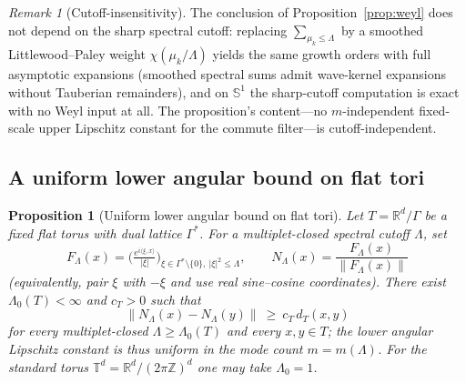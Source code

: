 \documentclass[11pt]{article}
\newtheorem{proposition}[theorem]{Proposition}
\theoremstyle{remark}
\newtheorem*{remark}{Remark}
\begin{document}
\begin{remark}[Cutoff-insensitivity]
The conclusion of Proposition~\ref{prop:weyl} does not depend on the sharp
spectral cutoff: replacing $\sum_{\mu_k\le\Lambda}$ by a smoothed
Littlewood--Paley weight $\chi(\mu_k/\Lambda)$ yields the same growth orders with
full asymptotic expansions (smoothed spectral sums admit wave-kernel expansions
without Tauberian remainders), and on $\mathbb S^1$ the sharp-cutoff computation
is exact with no Weyl input at all. The proposition's content---no $m$-independent
fixed-scale upper Lipschitz constant for the commute filter---is
cutoff-independent.
\end{remark}

\subsection*{A uniform lower angular bound on flat tori}
\begin{proposition}[Uniform lower angular bound on flat tori]
\label{prop:torus-lower-uniform}
Let $T=\mathbb R^d/\Gamma$ be a fixed flat torus with dual lattice $\Gamma^*$. For
a multiplet-closed spectral cutoff $\Lambda$, set
\[
F_\Lambda(x)=\Big(\tfrac{e^{i\langle\xi,x\rangle}}{\lvert\xi\rvert}\Big)_{\xi\in\Gamma^*\setminus\{0\},\ \lvert\xi\rvert^2\le\Lambda},
\qquad
N_\Lambda(x)=\frac{F_\Lambda(x)}{\lVert F_\Lambda(x)\rVert}
\]
(equivalently, pair $\xi$ with $-\xi$ and use real sine--cosine coordinates). There
exist $\Lambda_0(T)<\infty$ and $c_T>0$ such that
\[
\lVert N_\Lambda(x)-N_\Lambda(y)\rVert\ \ge\ c_T\,d_T(x,y)
\]
for every multiplet-closed $\Lambda\ge\Lambda_0(T)$ and every $x,y\in T$; the lower
angular Lipschitz constant is thus uniform in the mode count $m=m(\Lambda)$. For the
standard torus $\mathbb T^d=\mathbb R^d/(2\pi\mathbb Z)^d$ one may take $\Lambda_0=1$.
\end{proposition}
\end{document}
